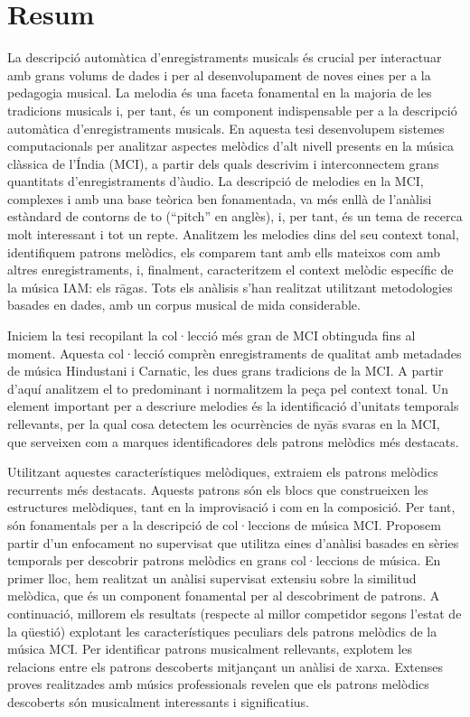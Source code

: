 
\chapter{Resum}

La descripció automàtica d’enregistraments musicals és crucial per interactuar amb grans volums de dades i per al desenvolupament de noves eines per a la pedagogia musical. La melodia és una faceta fonamental en la majoria de les tradicions musicals i, per tant, és un component indispensable per a la descripció automàtica d’enregistraments musicals. En aquesta tesi desenvolupem sistemes computacionals per analitzar aspectes melòdics d'alt nivell presents en la música clàssica de l’Índia (MCI), a partir dels quals descrivim i interconnectem grans quantitats d'enregistraments d'àudio. La descripció de melodies en la MCI, complexes i amb una base teòrica ben fonamentada, va més enllà de l’anàlisi estàndard de contorns de to (“pitch” en anglès), i, per tant, és un tema de recerca molt interessant i tot un repte. Analitzem les melodies dins del seu context tonal, identifiquem patrons melòdics, els comparem tant amb ells mateixos com amb altres enregistraments, i, finalment, caracteritzem el context melòdic específic de la música IAM: els rāgas. Tots els anàlisis s’han realitzat utilitzant metodologies basades en dades, amb un corpus musical de mida considerable.

Iniciem la tesi recopilant la col·lecció més gran de MCI obtinguda fins al moment. Aquesta col·lecció comprèn enregistraments de qualitat amb metadades de música Hindustani i Carnatic, les dues grans tradicions de la MCI. A partir d’aquí analitzem el to predominant i normalitzem la peça pel context tonal. Un element important per a descriure melodies és la identificació d’unitats temporals rellevants, per la qual cosa detectem les ocurrències de nyās svaras en la MCI, que serveixen com a marques identificadores dels patrons melòdics més destacats.

Utilitzant aquestes característiques melòdiques, extraiem els patrons melòdics recurrents més destacats. Aquests patrons són els blocs que construeixen les estructures melòdiques, tant en la improvisació i com en la composició. Per tant, són fonamentals per a la descripció de col·leccions de música MCI. Proposem partir d’un enfocament no supervisat que utilitza eines d'anàlisi basades en sèries temporals per descobrir patrons melòdics en grans col·leccions de música. En primer lloc, hem realitzat un anàlisi supervisat extensiu sobre la similitud melòdica, que és un component fonamental per al descobriment de patrons. A continuació, millorem els resultats (respecte al millor competidor segons l’estat de la qüestió) explotant les característiques peculiars dels patrons melòdics de la música MCI. Per identificar patrons musicalment rellevants, explotem les relacions entre els patrons descoberts mitjançant un anàlisi de xarxa. Extenses proves realitzades amb músics professionals revelen que els patrons melòdics descoberts són musicalment interessants i significatius.

